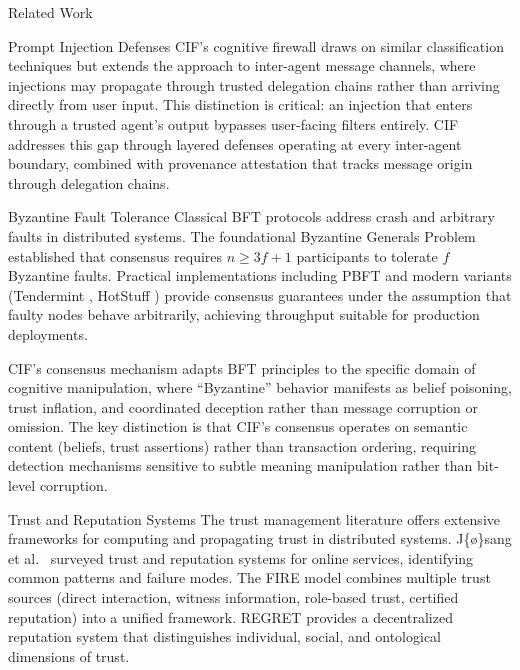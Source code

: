 \documentclass[
  ignorenonframetext,
]{beamer}
\begin{document}
\begin{frame}{Related Work}
\begin{block}{Prompt Injection Defenses}
CIF's cognitive firewall draws on similar classification techniques but
extends the approach to inter-agent message channels, where injections
may propagate through trusted delegation chains rather than arriving
directly from user input. This distinction is critical: an injection
that enters through a trusted agent's output bypasses user-facing
filters entirely. CIF addresses this gap through layered defenses
operating at every inter-agent boundary, combined with provenance
attestation that tracks message origin through delegation chains.
\end{block}

\begin{block}{Byzantine Fault Tolerance}
\protect{}\label{byzantine-fault-tolerance}
Classical BFT protocols \cite{lamport1982byzantine, dwork1988consensus}
address crash and arbitrary faults in distributed systems. The
foundational Byzantine Generals Problem established that consensus
requires \(n \geq 3f + 1\) participants to tolerate \(f\) Byzantine
faults. Practical implementations including PBFT
\cite{castro1999practical} and modern variants (Tendermint
\cite{buchman2016tendermint}, HotStuff \cite{yin2019hotstuff}) provide
consensus guarantees under the assumption that faulty nodes behave
arbitrarily, achieving throughput suitable for production deployments.

CIF's consensus mechanism adapts BFT principles to the specific domain
of cognitive manipulation, where ``Byzantine'' behavior manifests as
belief poisoning, trust inflation, and coordinated deception rather than
message corruption or omission. The key distinction is that CIF's
consensus operates on semantic content (beliefs, trust assertions)
rather than transaction ordering, requiring detection mechanisms
sensitive to subtle meaning manipulation rather than bit-level
corruption.
\end{block}

\begin{block}{Trust and Reputation Systems}
\protect{}\label{trust-and-reputation-systems}
The trust management literature offers extensive frameworks for
computing and propagating trust in distributed systems. J\{\o\}sang et
al.~\cite{josang2007survey} surveyed trust and reputation systems for
online services, identifying common patterns and failure modes. The FIRE
model \cite{huynh2006fire} combines multiple trust sources (direct
interaction, witness information, role-based trust, certified
reputation) into a unified framework. REGRET \cite{sabater2001regret}
provides a decentralized reputation system that distinguishes
individual, social, and ontological dimensions of trust.


\end{block}
\end{frame}
\end{document}
